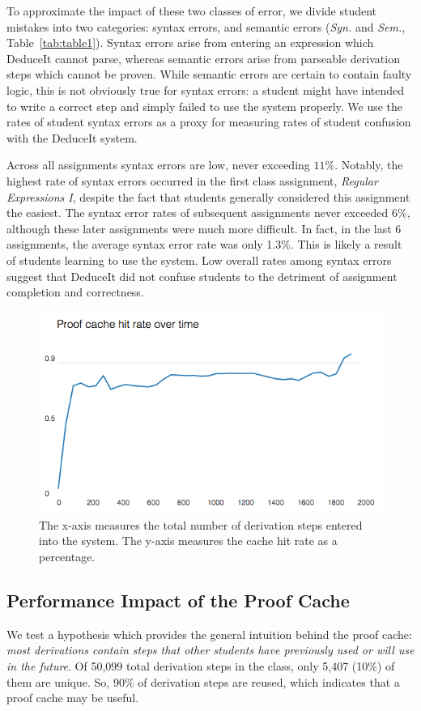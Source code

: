 \documentclass{sigchi}
\begin{document}
To approximate the impact of these two classes of error, we divide student mistakes into two categories: syntax errors, and semantic errors (\textit{Syn.} and \textit{Sem.}, Table~\ref{tab:table1}). Syntax errors arise from entering an expression which DeduceIt cannot parse, whereas semantic errors arise from parseable derivation steps which cannot be proven. While semantic errors are certain to contain faulty logic, this is not obviously true for syntax errors: a student might have intended to write a correct step and simply failed to use the system properly. We use the rates of student syntax errors as a proxy for measuring rates of student confusion with the DeduceIt system.

Across all assignments syntax errors are low, never exceeding $11\%$. Notably, the highest rate of syntax errors occurred in the first class assignment, \textit{Regular Expressions I}, despite the fact that students generally considered this assignment the easiest. The syntax error rates of subsequent assignments never exceeded $6\%$, although these later assignments were much more difficult. In fact, in the last 6 assignments, the average syntax error rate was only 1.3\%. This is likely a result of students learning to use the system. Low overall rates among syntax errors suggest that DeduceIt did not confuse students to the detriment of assignment completion and correctness.

\begin{figure}[tb]
\centering
\includegraphics[width=1\columnwidth]{cache}
\caption{The x-axis measures the total number of derivation steps entered into the system. The y-axis measures the cache hit rate as a percentage.}
\label{fig:proofcache}
\end{figure}

\subsection{Performance Impact of the Proof Cache}
We test a hypothesis which provides the general intuition behind the proof cache: \textit{most derivations contain steps that other students have previously used or will use in the future}. Of 50,099 total derivation steps in the class, only 5,407 (10\%) of them are unique. So, 90\% of derivation steps are reused, which indicates that a proof cache may be useful.
\end{document}
